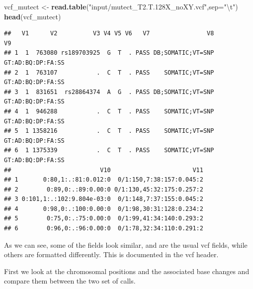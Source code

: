\documentclass[]{article}
\newenvironment{Shaded}{\begin{snugshade}}{\end{snugshade}}
\newcommand{\CharTok}[1]{\textcolor[rgb]{0.31,0.60,0.02}{#1}}
\newcommand{\DataTypeTok}[1]{\textcolor[rgb]{0.13,0.29,0.53}{#1}}
\newcommand{\KeywordTok}[1]{\textcolor[rgb]{0.13,0.29,0.53}{\textbf{#1}}}
\newcommand{\NormalTok}[1]{#1}
\newcommand{\StringTok}[1]{\textcolor[rgb]{0.31,0.60,0.02}{#1}}
\begin{document}
\begin{Shaded}
\begin{Highlighting}[]
\NormalTok{vcf_mutect <-}\StringTok{ }\KeywordTok{read.table}\NormalTok{(}\StringTok{"input/mutect_T2.T.128X_noXY.vcf"}\NormalTok{,}\DataTypeTok{sep=}\StringTok{"}\CharTok{\textbackslash{}t}\StringTok{"}\NormalTok{)}
\KeywordTok{head}\NormalTok{(vcf_mutect)}
\end{Highlighting}
\end{Shaded}

\begin{verbatim}
##   V1      V2          V3 V4 V5 V6   V7                V8                V9
## 1  1  763080 rs189703925  G  T  . PASS DB;SOMATIC;VT=SNP GT:AD:BQ:DP:FA:SS
## 2  1  763107           .  C  T  . PASS    SOMATIC;VT=SNP GT:AD:BQ:DP:FA:SS
## 3  1  831651  rs28864374  A  G  . PASS DB;SOMATIC;VT=SNP GT:AD:BQ:DP:FA:SS
## 4  1  946288           .  C  T  . PASS    SOMATIC;VT=SNP GT:AD:BQ:DP:FA:SS
## 5  1 1358216           .  C  T  . PASS    SOMATIC;VT=SNP GT:AD:BQ:DP:FA:SS
## 6  1 1375339           .  C  T  . PASS    SOMATIC;VT=SNP GT:AD:BQ:DP:FA:SS
##                         V10                       V11
## 1       0:80,1:.:81:0.012:0  0/1:150,7:38:157:0.045:2
## 2        0:89,0:.:89:0.00:0 0/1:130,45:32:175:0.257:2
## 3 0:101,1:.:102:9.804e-03:0  0/1:148,7:37:155:0.045:2
## 4       0:98,0:.:100:0.00:0  0/1:98,30:31:128:0.234:2
## 5        0:75,0:.:75:0.00:0  0/1:99,41:34:140:0.293:2
## 6        0:96,0:.:96:0.00:0  0/1:78,32:34:110:0.291:2
\end{verbatim}

As we can see, some of the fields look similar, and are the usual vcf
fields, while others are formatted differently. This is documented in
the vcf header.

First we look at the chromosomal positions and the associated base
changes and compare them between the two set of calls.
\end{document}
